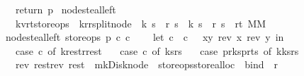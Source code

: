 \begin{isabellebody}
\ \ return\ p{\isacharparenright}{\isacharparenright}{\isacharparenright}{\isacharparenright}{\isachardoublequoteclose}\isanewline
\isanewline
\isanewline
{}\isamarkupfalse%
\ node{\isacharunderscore}steal{\isacharunderscore}left\ {\isacharcolon}{\isacharcolon}\ \isanewline
\ \ {\isachardoublequoteopen}{\isacharparenleft}{\isacharprime}k{\isacharcomma}{\isacharprime}v{\isacharcomma}{\isacharprime}r{\isacharcomma}{\isacharprime}t{\isacharparenright}store{\isacharunderscore}ops\ {\isasymRightarrow}\ {\isacharparenleft}{\isacharprime}k{\isacharcomma}{\isacharprime}r{\isacharparenright}rsplit{\isacharunderscore}node\ {\isasymRightarrow}\ {\isacharparenleft}{\isacharprime}k\ s\ {\isacharasterisk}\ {\isacharprime}r\ s{\isacharparenright}\ {\isasymRightarrow}\ {\isacharparenleft}{\isacharprime}k\ s\ {\isacharasterisk}\ {\isacharprime}r\ s{\isacharparenright}\ {\isasymRightarrow}\ {\isacharparenleft}{\isacharprime}r{\isacharcomma}{\isacharprime}t{\isacharparenright}\ MM{\isachardoublequoteclose}\ \isanewline
{}\isanewline
{\isachardoublequoteopen}node{\isacharunderscore}steal{\isacharunderscore}left\ store{\isacharunderscore}ops\ p\ c{}\ c{}\ {\isacharequal}\ {\isacharparenleft}\isanewline
\ \ let\ c{}\ {\isacharequal}\ {\isacharparenleft}c{}\ {\isacharbar}{\isachargreater}\ {\isacharparenleft}{\isacharpercent}\ {\isacharparenleft}x{\isacharcomma}y{\isacharparenright}{\isachardot}\ {\isacharparenleft}rev\ x{\isacharcomma}\ rev\ y{\isacharparenright}{\isacharparenright}{\isacharparenright}\ in\isanewline
\ \ case\ c{}\ of\ {\isacharparenleft}k{}{\isacharhash}rest{\isacharcomma}r{}{\isacharhash}rest{\isacharprime}{\isacharparenright}\ {\isasymRightarrow}\isanewline
\ \ case\ c{}\ of\ {\isacharparenleft}ks{}{\isacharcomma}rs{}{\isacharparenright}\ {\isasymRightarrow}\isanewline
\ \ case\ {\isacharparenleft}p{\isacharbar}{\isachargreater}r{\isacharunderscore}ks{}{\isacharcomma}p{\isacharbar}{\isachargreater}r{\isacharunderscore}ts{}{\isacharparenright}\ of\ {\isacharparenleft}k{}{\isacharhash}ks{}{\isacharcomma}{\isacharunderscore}{\isacharhash}rs{}{\isacharparenright}\ {\isasymRightarrow}\isanewline
\ \ {\isacharparenleft}rev\ rest{\isacharcomma}rev\ rest{\isacharprime}{\isacharparenright}\ {\isacharbar}{\isachargreater}\ mk{\isacharunderscore}Disk{\isacharunderscore}node\ {\isacharbar}{\isachargreater}\ {\isacharparenleft}store{\isacharunderscore}ops{\isacharbar}{\isachargreater}store{\isacharunderscore}alloc{\isacharparenright}\ {\isacharbar}{\isachargreater}\ bind\ {\isacharparenleft}{\isacharpercent}\ r{}{\isachardot}\isanewline

\end{isabellebody}
